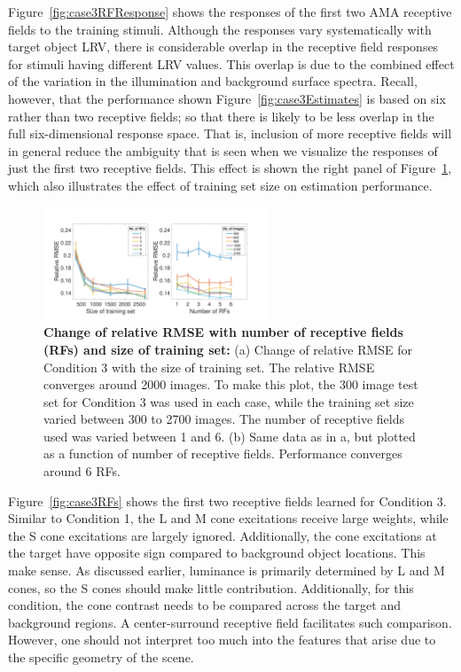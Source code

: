 \documentclass{jov}
\begin{document}
Figure~\ref{fig:case3RFResponse} shows the responses of the first two AMA receptive fields to the training stimuli.
Although the responses vary systematically with target object LRV, there is considerable overlap in the receptive field responses for stimuli having different LRV values.
This overlap is due to the combined effect of the variation in the illumination and background surface spectra.
Recall, however, that the performance shown Figure~\ref{fig:case3Estimates} is based on six rather than two receptive fields;
so that there is likely to be less overlap in the full six-dimensional response space.
That is, inclusion of more receptive fields will in general reduce the ambiguity that is seen when we visualize the responses of just the first two receptive fields.
This effect is shown the right panel of Figure~\ref{fig:RMSEvsRF}, which also illustrates the effect of training set size on estimation performance. 

\begin{figure}
\centering
\includegraphics[width=0.6\textwidth]{../FiguresDraft5/Figure13/Figure13.pdf}
\caption{{\bf Change of relative RMSE with number of receptive fields (RFs) and size of training set:} (a) Change of relative RMSE for Condition 3 with the size of training set. The relative RMSE converges around 2000 images. To make this plot, the 300 image test set for Condition 3 was used in each case, while the training set size varied between 300 to 2700 images. The number of receptive fields used was varied between 1 and 6. (b) Same data as in a, but plotted as a function of number of receptive fields. Performance converges around 6 RFs.}
 \label{fig:RMSEvsRF}
\end{figure}


Figure~\ref{fig:case3RFs} shows the first two receptive fields learned for Condition 3.
Similar to Condition 1, the L and M cone excitations receive large weights, while the S cone excitations are largely ignored. 
Additionally, the cone excitations at the target have opposite sign compared to background object locations.
This make sense.
As discussed earlier, luminance is primarily determined by L and M cones, so the S cones should make little
contribution.
Additionally, for this condition, the cone contrast needs to be compared across the target and background regions. 
A center-surround receptive field facilitates such comparison.
However, one should not interpret too much into the features that arise due to the specific geometry of the scene.
\end{document}
